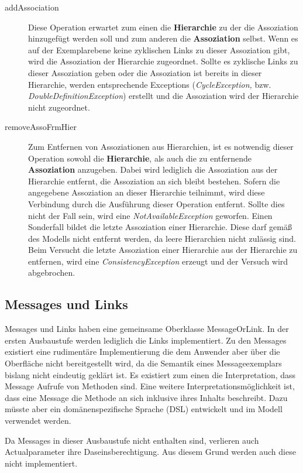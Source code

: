 \begin{description}
\item[addAssociation] Diese Operation erwartet zum einen die \textbf{Hierarchie} zu der die Assoziation hinzugefügt werden soll und zum anderen die \textbf{Assoziation} selbst.
Wenn es auf der Exemplarebene keine zyklischen Links zu dieser Assoziation gibt, wird die Assoziation der Hierarchie zugeordnet. Sollte es zyklische Links
zu dieser Assoziation geben oder die Assoziation ist bereits in dieser Hierarchie, werden entsprechende Exceptions (\emph{CycleException,} bzw. \emph{DoubleDefinitionException}) 
erstellt und die Assoziation wird der Hierarchie nicht zugeordnet.
\item[removeAssoFrmHier] Zum Entfernen von Assoziationen aus Hierarchien, ist es notwendig dieser Operation sowohl die \textbf{Hierarchie}, als auch die zu entfernende 
\textbf{Assoziation} anzugeben. Dabei wird lediglich die Assoziation aus der Hierarchie entfernt, die Assoziation an sich bleibt bestehen. 
Sofern die angegebene Assoziation an dieser Hierarchie teilnimmt, wird diese Verbindung durch die Ausführung dieser Operation entfernt. 
Sollte dies nicht der Fall sein, wird eine \emph{NotAvailableException} geworfen. Einen Sonderfall bildet die letzte Assoziation einer
Hierarchie. Diese darf gemäß des Modells nicht entfernt werden, da leere Hierarchien nicht zulässig sind. Beim Versucht die letzte
Assoziation einer Hierarchie aus der Hierarchie zu entfernen, wird eine \emph{ConsistencyException} erzeugt und der Versuch wird abgebrochen. 
\end{description}


\newpage
\subsection{Messages und Links}

Messages und Links haben eine gemeinsame Oberklasse MessageOrLink. In der ersten Ausbaustufe werden lediglich die Links implementiert. Zu den Messages existiert eine rudimentäre
Implementierung die dem Anwender aber über die Oberfläche nicht bereitgestellt wird, da die 
Semantik eines Messageexemplars bislang nicht eindeutig geklärt ist.
Es existiert zum einen die Interpretation, dass Message Aufrufe von Methoden sind. Eine weitere Interpretationsmöglichkeit ist, dass eine Message die Methode an sich inklusive ihres Inhalts beschreibt. 
Dazu müsste aber ein domänenspezifische Sprache (DSL) entwickelt und im Modell verwendet werden.

Da Messages in dieser Ausbaustufe nicht enthalten sind, verlieren auch Actualparameter ihre Daseinsberechtigung. Aus diesem Grund werden auch diese nicht implementiert.
 \vspace{15pt}

